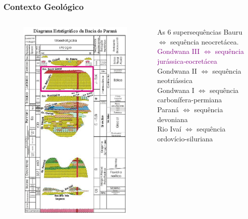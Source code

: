 \documentclass[aspectratio=10]{beamer} %
\begin{document}
\begin{frame}
\frametitle{Contexto Geológico}
\begin{columns}
\begin{column}{0.4\textwidth}
\begin{figure}
\includegraphics[scale=0.36]{Imagens/diagramagondwanaiii.png}
\end{figure}
\end{column}
\begin{column}{0.55\textwidth}
\begin{block}{As $6$ supersequências}
Bauru $\Longleftrightarrow$  sequência neocretácea.\\
\textcolor{purple}{Gondwana III $\Longleftrightarrow$ sequência jurássica-eocretácea}\\
Gondwana II $\Longleftrightarrow$ sequência neotriássica \\
Gondwana I $\Longleftrightarrow$ sequência carbonífera-permiana\\ 
Paraná $\Longleftrightarrow$ sequência devoniana\\
Rio Ivaí $\Longleftrightarrow$ sequência ordovício-siluriana\\
\cite{Vail_1977,assine_1994,milani_orogenias_1998}
\end{block}
\end{column}
\end{columns}
\end{frame}
\end{document}
